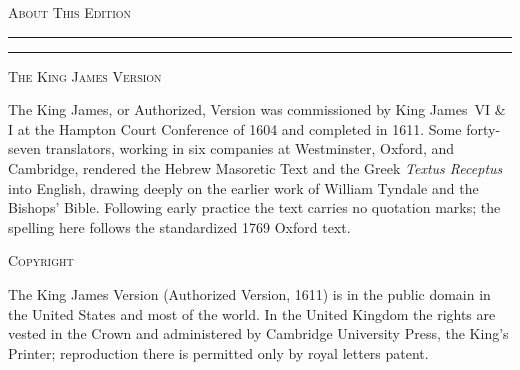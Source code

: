 \clearpage
\thispagestyle{empty}%
\null\vspace*{16mm}
\begin{center}
  {\Large\booktitlefont\scshape About This Edition\par}
  \vspace{3pt}
  {\color{gospels!70}\rule{28mm}{0.4pt}\enspace\rule{28mm}{0.4pt}\par}
\end{center}
\vspace{9mm}
\begin{center}\begin{minipage}{0.74\textwidth}
\setlength{\parskip}{6pt plus 2pt}\small

{\booktitlefont\scshape The King James Version}\par
The King James, or Authorized, Version was commissioned by King James~VI \& I at
the Hampton Court Conference of 1604 and completed in 1611. Some forty-seven
translators, working in six companies at Westminster, Oxford, and Cambridge,
rendered the Hebrew Masoretic Text and the Greek \emph{Textus Receptus} into
English, drawing deeply on the earlier work of William Tyndale and the Bishops'
Bible. Following early practice the text carries no quotation marks; the spelling
here follows the standardized 1769 Oxford text.

\medskip
{\booktitlefont\scshape Copyright}\par
The King James Version (Authorized Version, 1611) is in the public domain in the
United States and most of the world. In the United Kingdom the rights are vested
in the Crown and administered by Cambridge University Press, the King's Printer;
reproduction there is permitted only by royal letters patent.


\end{minipage}\end{center}
\vfill
\clearpage
